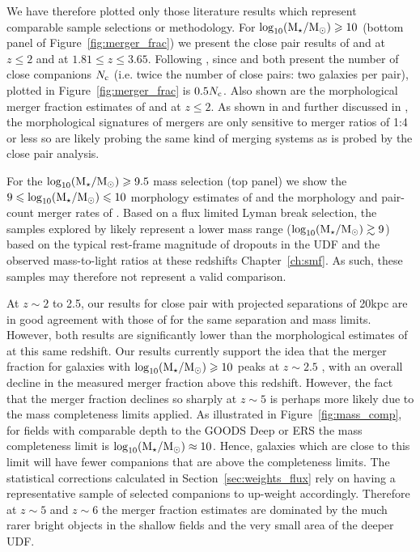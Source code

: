 We have therefore plotted only those literature results which represent comparable sample selections or methodology. For $\log_{10}(\text{M}_{\star} / \text{M}_{\odot}) \geqslant 10$ (bottom panel of Figure~\ref{fig:merger_frac}) we present the close pair results of \citet{RyanJr:2008ka} and \citet{LopezSanjuan:2010cz} at $z\leq2$ and \citet{Tasca:2014gz} at $1.81 \leq z \leq 3.65$. Following , since \citet{RyanJr:2008ka} and \citet{LopezSanjuan:2010cz} both present the number of close companions $N_{\rm{c}}$ (i.e. twice the number of close pairs: two galaxies per pair), plotted in Figure~\ref{fig:merger_frac} is $0.5 N_{\rm{c}}$. Also shown are the morphological merger fraction estimates of \citet{Conselice:2008de} and \citet{Conselice:2009fe} at $z \leq 2$. As shown in \citet{Lotz:2008kr} and further discussed in \citet{Bluck:2012dh}, the morphological signatures of mergers are only sensitive to merger ratios of 1:4 or less so are likely probing the same kind of merging systems as is probed by the close pair analysis.

For the $\log_{10}(\text{M}_{\star} / \text{M}_{\odot}) \geqslant 9.5$ mass selection (top panel) we show the $9 \leqslant \log_{10}(\text{M}_{\star} / \text{M}_{\odot}) \leqslant 10$ morphology estimates of \citet{Conselice:2008de} and the morphology and pair-count merger rates of \citet{2009MNRAS.397..208C}. Based on a flux limited Lyman break selection, the samples explored by \citet{2009MNRAS.397..208C} likely represent a lower mass range ($\log_{10}(\text{M}_{\star} / \text{M}_{\odot}) \gtrsim 9$) based on the typical rest-frame magnitude of dropouts in the UDF and the observed mass-to-light ratios at these redshifts Chapter~\ref{ch:smf}. As such, these samples may therefore not represent a valid comparison. 

At $z\sim2$ to 2.5, our results for close pair with projected separations of 20kpc are in good agreement with those of \citet{RyanJr:2008ka} for the same separation and mass limits. However, both results are significantly lower than the morphological estimates of \citet{Conselice:2008de} at this same redshift. Our results currently support the idea that the merger fraction for galaxies with $\log_{10}(\text{M}_{\star} / \text{M}_{\odot}) \geqslant 10$ peaks at $z\sim2.5$ \citep{Conselice:2014ct}, with an overall decline in the measured merger fraction above this redshift. However, the fact that the merger fraction declines so sharply at $z\sim5$ is perhaps more likely due to the mass completeness limits applied. As illustrated in Figure~\ref{fig:mass_comp}, for fields with comparable depth to the GOODS Deep or ERS the mass completeness limit is $\log_{10}(\text{M}_{\star} / \text{M}_{\odot}) \approx 10$. Hence, galaxies which are close to this limit will have fewer companions that are above the completeness limits. The statistical corrections calculated in Section~\ref{sec:weights_flux} rely on having a representative sample of selected companions to up-weight accordingly. Therefore at $z\sim5$ and $z\sim6$ the merger fraction estimates are dominated by the much rarer bright objects in the shallow fields and the very small area of the deeper UDF.

